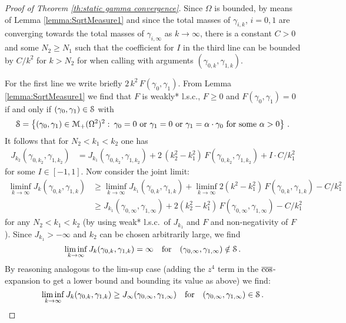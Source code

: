 \begin{proof}[Proof of Theorem \ref{th:static gamma convergence}]
Since $\Omega$ is bounded, by means of Lemma \ref{lemma:SqrtMeasure1} and since the total masses of $\gamma_{i,k}$, $i=0,1$ are converging towards the total masses of $\gamma_{i,\infty}$ as $k \rightarrow \infty$, there is a constant $C>0$ and some $N_2 \geq N_1$ such that the coefficient for $I$ in the third line can be bounded by $C/k^2$ for $k > N_2$ for when calling with arguments $(\gamma_{0,k},\gamma_{1,k})$.

For the first line we write briefly $2\,k^2\,F(\gamma_0,\gamma_1)$. From Lemma \ref{lemma:SqrtMeasure1} we find that $F$ is weakly* l.s.c., $F\geq0$ and $F(\gamma_0,\gamma_1)=0$ if and only if $(\gamma_0,\gamma_1) \in \mathcal{S}$ with
\begin{equation*}
	\mathcal{S} = \left\{ (\gamma_0,\gamma_1) \in \mathcal{M}_+(\Omega^2)^2 \,\colon\, \gamma_0 = 0 \textnormal{ or } \gamma_1 = 0 \textnormal{ or } \gamma_1 = \alpha \cdot \gamma_0 \textnormal{ for some } \alpha > 0 \right\}\,.
\end{equation*}
%
It follows that for $N_2 < k_1 < k_2$ one has
\begin{align*}
	J_{k_2}(\gamma_{0,k_2},\gamma_{1,k_2}) & = J_{k_1}(\gamma_{0,k_2},\gamma_{1,k_2}) + 2\,(k_2^2-k_1^2)\,F(\gamma_{0,k_2},\gamma_{1,k_2}) + I \cdot C/k_1^2
\end{align*}
for some $I \in [-1,1]$. Now consider the joint limit:
\begin{align*}
	\liminf_{k \rightarrow \infty} J_k(\gamma_{0,k},\gamma_{1,k}) & \geq \liminf_{k \rightarrow \infty} J_{k_1}(\gamma_{0,k},\gamma_{1,k}) + \liminf_{k \rightarrow \infty} 2(k^2 - k_1^2)\,F(\gamma_{0,k},\gamma_{1,k}) - C/k_1^2 \\
	& \geq J_{k_1}(\gamma_{0,\infty},\gamma_{1,\infty}) + 2(k_2^2 - k_1^2)\,F(\gamma_{0,\infty},\gamma_{1,\infty}) - C/k_1^2
\end{align*}
for any $N_2 < k_1 < k_2$ (by using weak* l.s.c.~of $J_{k_1}$ and $F$ and non-negativity of $F$). Since $J_{k_1} > - \infty$ and $k_2$ can be chosen arbitrarily large, we find
\begin{equation*}
	\liminf_{k \rightarrow \infty} J_k(\gamma_{0,k},\gamma_{1,k}) = \infty \quad \text{for} \quad (\gamma_{0,\infty},\gamma_{1,\infty}) \notin \mathcal{S}\,.
\end{equation*}
By reasoning analogous to the lim-sup case (adding the $z^4$ term in the ${\overline{\cos}}$-expansion to get a lower bound and bounding its value as above) we find:
\begin{equation*}
	\liminf_{k \rightarrow \infty} J_k(\gamma_{0,k},\gamma_{1,k}) \geq J_\infty(\gamma_{0,\infty},\gamma_{1,\infty}) \quad \text{for} \quad (\gamma_{0,\infty},\gamma_{1,\infty}) \in \mathcal{S}\,.
\end{equation*}
\end{proof}
